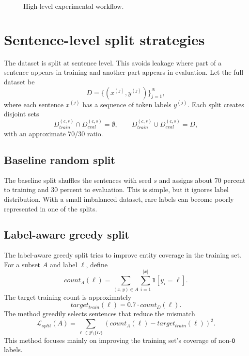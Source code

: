 \documentclass[12pt,a4paper]{report}
\begin{document}
\begin{figure}[htbp]
\centering
{}
\caption{High-level experimental workflow.}
\label{fig:workflow}
\end{figure}

\section{Sentence-level split strategies}
The dataset is split at sentence level. This avoids leakage where part of a sentence appears in training and another part appears in evaluation. Let the full dataset be
\[
D=\{(x^{(j)},y^{(j)})\}_{j=1}^{N},
\]
where each sentence $x^{(j)}$ has a sequence of token labels $y^{(j)}$. Each split creates disjoint sets
\[
D_{train}^{(c,s)} \cap D_{eval}^{(c,s)} = \emptyset,
\qquad
D_{train}^{(c,s)} \cup D_{eval}^{(c,s)} = D,
\]
with an approximate 70/30 ratio.

\subsection{Baseline random split}
The baseline split shuffles the sentences with seed $s$ and assigns about 70 percent to training and 30 percent to evaluation. This is simple, but it ignores label distribution. With a small imbalanced dataset, rare labels can become poorly represented in one of the splits.

\subsection{Label-aware greedy split}
The label-aware greedy split tries to improve entity coverage in the training set. For a subset $A$ and label $\ell$, define
\[
count_A(\ell)=\sum_{(x,y)\in A}\sum_{i=1}^{|x|}\mathbf{1}[y_i=\ell].
\]
The target training count is approximately
\[
target_{train}(\ell)=0.7\cdot count_D(\ell).
\]
The method greedily selects sentences that reduce the mismatch
\[
\mathcal{L}_{split}(A)=\sum_{\ell\in\mathcal{Y}\setminus\{O\}}\left(count_A(\ell)-target_{train}(\ell)\right)^2.
\]
This method focuses mainly on improving the training set's coverage of non-\texttt{O} labels.
\end{document}
